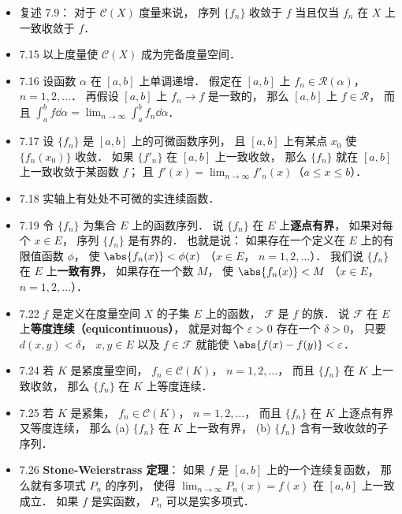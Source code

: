 \begin{itemize}
\item 复述 7.9： 对于 $\mathscr C(X)$ 度量来说， 序列 $\{f_n\}$ 收敛于 $f$ 当且仅当 $f_n$ 在 $X$ 上一致收敛于 $f$．

\item 7.15 以上度量使 $\mathscr C(X)$ 成为完备度量空间．

\item 7.16 设函数 $\alpha$ 在 $[a,b]$ 上单调递增． 假定在 $[a,b]$ 上 $f_n\in\mathscr R(\alpha)$， $n=1,2,\dots$． 再假设 $[a,b]$ 上 $f_n\to f$ 是一致的， 那么 $[a,b]$ 上 $f\in\mathscr R$， 而且 $\int_a^b f\dd{\alpha} = \lim_{n\to\infty}\int_a^b f_n\dd{\alpha}$．

\item 7.17 设 $\{f_n\}$ 是 $[a,b]$ 上的可微函数序列， 且 $[a,b]$ 上有某点 $x_0$ 使 $\{f_n(x_0)\}$ 收敛． 如果 $\{f'_n\}$ 在 $[a,b]$ 上一致收敛， 那么 $\{f_n\}$ 就在 $[a,b]$ 上一致收敛于某函数 $f$； 且 $f'(x) = \lim_{n\to\infty} f'_n(x)$（$a\leqslant x \leqslant b$）．

\item 7.18 实轴上有处处不可微的实连续函数．

\item 7.19 令 $\{f_n\}$ 为集合 $E$ 上的函数序列． 说 $\{f_n\}$ 在 $E$ 上\textbf{逐点有界}， 如果对每个 $x\in E$， 序列 $\{f_n\}$ 是有界的． 也就是说： 如果存在一个定义在 $E$ 上的有限值函数 $\phi$， 使 $\abs{f_n(x)}<\phi(x)$ （$x\in E$， $n=1,2,\dots$）． 我们说 $\{f_n\}$ 在 $E$ 上\textbf{一致有界}， 如果存在一个数 $M$， 使 $\abs{f_n(x)}<M$ （$x\in E$， $n=1,2,\dots$）．

\item 7.22 $f$ 是定义在度量空间 $X$ 的子集 $E$ 上的函数， $\mathscr F$ 是 $f$ 的族． 说 $\mathscr F$ 在 $E$ 上\textbf{等度连续（equicontinuous）}， 就是对每个 $\varepsilon>0$ 存在一个 $\delta >0$， 只要 $d(x,y)<\delta$， $x,y\in E$ 以及 $f\in \mathscr F$ 就能使 $\abs{f(x)-f(y)}<\varepsilon$．

\item 7.24 若 $K$ 是紧度量空间， $f_n\in \mathscr C(K)$， $n=1,2,\dots$， 而且 $\{f_n\}$ 在 $K$ 上一致收敛， 那么 $\{f_n\}$ 在 $K$ 上等度连续．

\item 7.25 若 $K$ 是紧集， $f_n\in \mathscr C(K)$， $n=1,2,\dots$， 而且 $\{f_n\}$ 在 $K$ 上逐点有界又等度连续， 那么 (a) $\{f_n\}$ 在 $K$ 上一致有界， (b) $\{f_n\}$ 含有一致收敛的子序列．

\item 7.26 \textbf{Stone-Weierstrass 定理}： 如果 $f$ 是 $[a,b]$ 上的一个连续复函数， 那么就有多项式 $P_n$ 的序列， 使得 $\lim_{n\to\infty} P_n(x) = f(x)$ 在 $[a,b]$ 上一致成立． 如果 $f$ 是实函数， $P_n$ 可以是实多项式．


\end{itemize}
